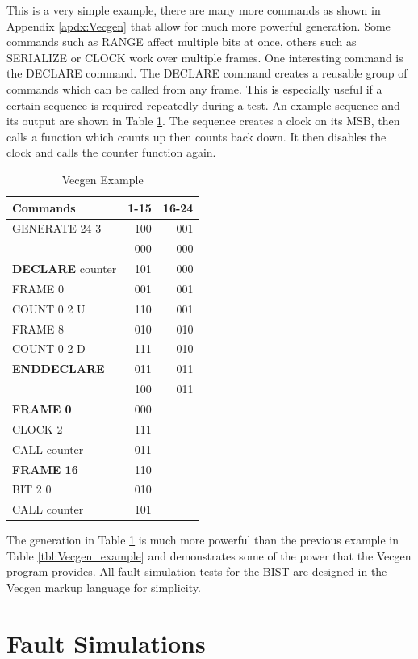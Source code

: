 \documentclass[12pt]{report}
\begin{document}
This is a very simple example, there are many more commands as shown in Appendix \ref{apdx:Vecgen} that allow for much more powerful generation.  Some commands such as RANGE affect multiple bits at once, others such as SERIALIZE or CLOCK work over multiple frames.  One interesting command is the DECLARE command.  The DECLARE command creates a reusable group of commands which can be called from any frame.  This is especially useful if a certain sequence is required repeatedly during a test.  An example sequence and its output are shown in Table \ref{tbl:countsequence}.  The sequence creates a clock on its MSB, then calls a function which counts up then counts back down.  It then disables the clock and calls the counter function again.
\begin{table}
	\caption{Vecgen Example}
	\begin{center}
		\begin{tabular}{l|r|r}
		Commands & 1-15 & 16-24 \\ \hline
		GENERATE 24 3 & 100 & 001 \\
		 & 000 & 000 \\
		\textbf{DECLARE} counter & 101 & 000 \\
		FRAME 0	& 001 & 001 \\
		COUNT 0 2 U & 110 & 001 \\
		FRAME 8 & 010 & 010 \\
		COUNT 0 2 D & 111 & 010 \\
		\textbf{ENDDECLARE} & 011 & 011 \\ 
		 & 100 & 011 \\
 		\textbf{FRAME 0} & 000 & \\
		CLOCK 2 & 111 &  \\
		CALL counter & 011 & \\
		\textbf{FRAME 16} & 110 & \\
		BIT 2 0 & 010 &  \\
		CALL counter & 101 & \\
		\end{tabular}
	\end{center}
	\label{tbl:countsequence}
\end{table}
The generation in Table \ref{tbl:countsequence} is much more powerful than the previous example in Table \ref{tbl:Vecgen_example} and demonstrates some of the power that the Vecgen program provides.  All fault simulation tests for the BIST are designed in the Vecgen markup language for simplicity.
\chapter{Fault Simulations}
\end{document}
